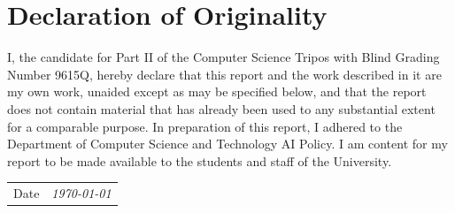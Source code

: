 \section*{Declaration of Originality}

I, the candidate for Part II of the Computer Science Tripos with Blind Grading Number 9615Q, hereby declare that this report and the work described in it are my own work, unaided except as may be specified below, and that the report does not contain material that has already been used to any substantial extent for a comparable purpose. In preparation of this report, I adhered to the Department of Computer Science and Technology AI Policy. I am content for my report to be made available to the students and staff of the University.

\vspace{1em}

\vspace{1cm}
\begin{tabular}{ll}
  Date & \textit{\today}
\end{tabular}

